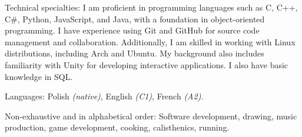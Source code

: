 \documentclass[10pt,a4paper]{article} %
\begin{document}
\spacedhrule{0.8em}{-0.4em} %


\inlineheadsection %
{Technical specialties:}
{I am proficient in programming languages such as C, C++, C\#, Python, JavaScript, and Java, 
with a foundation in object-oriented programming. I have experience using Git and 
GitHub for source code management and collaboration. Additionally, I am skilled in working 
with Linux distributions, including Arch and Ubuntu. My background also includes 
familiarity with Unity for developing interactive applications. I also have basic knowledge in SQL.}


\inlineheadsection %
{Languages:}
{Polish \textit{(native)}, English \textit{(C1)}, French \textit{(A2)}.}


\spacedhrule{1.6em}{-0.4em} %



\inlineheadsection %
{Non-exhaustive and in alphabetical order:}
{Software development, drawing, music production, game development, cooking, calisthenics, running.}

\end{document}
